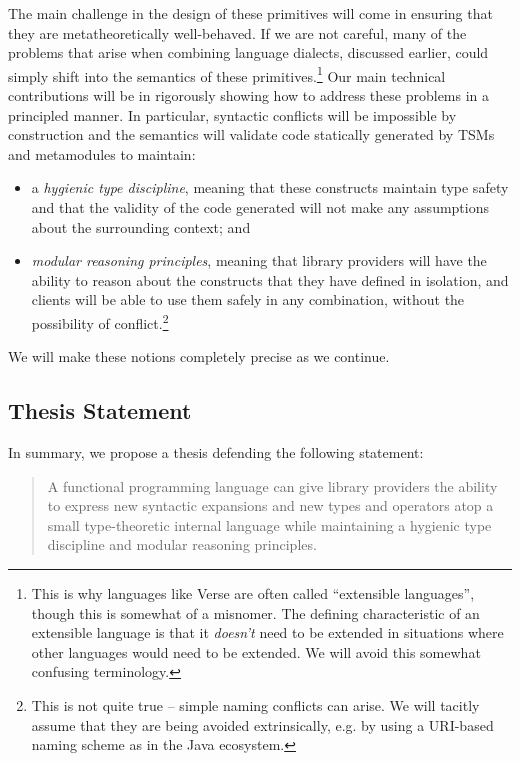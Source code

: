 The main challenge in the design of these primitives will come in ensuring that they are metatheoretically well-behaved. If we are not careful, many of the problems  that arise when combining language dialects, discussed earlier, could simply shift into the semantics of these primitives.\footnote{This is why languages  like Verse are often called ``extensible languages'', though this is somewhat of a misnomer. The defining characteristic of an extensible language is that it \emph{doesn't} need to be extended in situations where other languages would need to be extended. We will avoid this somewhat confusing terminology.} Our main technical contributions will be in rigorously showing how to address these problems in a principled manner. In particular, syntactic conflicts will be impossible by construction and the semantics will validate code statically generated by TSMs and metamodules to maintain:
\begin{itemize}
\item a \emph{hygienic type discipline}, meaning that these constructs maintain type safety and that the validity of the code generated will not make any assumptions about the surrounding context; and
\item \emph{modular reasoning principles}, meaning that library providers will have the ability to reason about the constructs that they have defined in isolation, and clients will be able to use them safely in any combination, without the possibility of conflict.\footnote{This is not quite true -- simple naming conflicts can arise. We will tacitly assume that they are being avoided extrinsically, e.g. by using a URI-based naming scheme as in the Java ecosystem.} 
\end{itemize}
We will make these notions completely precise as we continue.

\subsection{Thesis Statement}
In summary, we propose a thesis defending the following statement:
\begin{quote}
A functional programming language can give library providers the ability to %
express new syntactic expansions and new types and operators atop a small type-theoretic internal language while maintaining a hygienic type discipline and modular reasoning principles. %
\end{quote}

